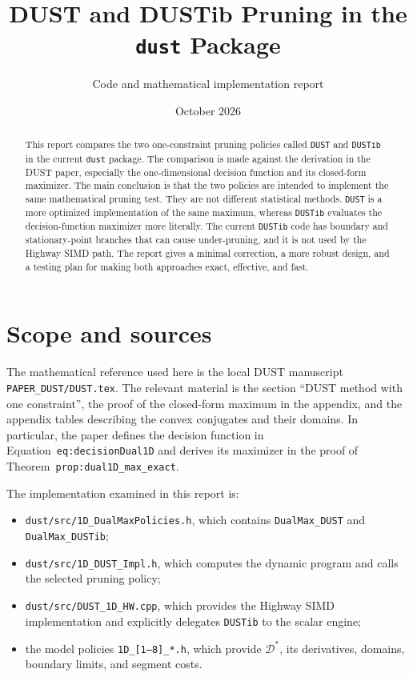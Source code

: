 \documentclass[11pt]{article}
\title{DUST and DUSTib Pruning in the \texttt{dust} Package}
\author{Code and mathematical implementation report}
\date{October 2026}
\newcommand{\Dstar}{\mathcal{D}^*}
\begin{document}
\maketitle

\begin{abstract}
This report compares the two one-constraint pruning policies called
\texttt{DUST} and \texttt{DUSTib} in the current \texttt{dust} package.
The comparison is made against the derivation in the DUST paper, especially
the one-dimensional decision function and its closed-form maximizer.  The
main conclusion is that the two policies are intended to implement the same
mathematical pruning test.  They are not different statistical methods.
\texttt{DUST} is a more optimized implementation of the same maximum, whereas
\texttt{DUSTib} evaluates the decision-function maximizer more literally.
The current \texttt{DUSTib} code has boundary and stationary-point branches
that can cause under-pruning, and it is not used by the Highway SIMD path.
The report gives a minimal correction, a more robust design, and a testing
plan for making both approaches exact, effective, and fast.
\end{abstract}

\tableofcontents

\section{Scope and sources}

The mathematical reference used here is the local DUST manuscript
\texttt{PAPER\_DUST/DUST.tex}.  The relevant material is the section
``DUST method with one constraint'', the proof of the closed-form maximum in
the appendix, and the appendix tables describing the convex conjugates and
their domains.  In particular, the paper defines the decision function in
Equation~\texttt{eq:decisionDual1D} and derives its maximizer in the proof of
Theorem~\texttt{prop:dual1D\_max\_exact}.

The implementation examined in this report is:

\begin{itemize}
  \item \texttt{dust/src/1D\_DualMaxPolicies.h}, which contains
        \texttt{DualMax\_DUST} and \texttt{DualMax\_DUSTib};
  \item \texttt{dust/src/1D\_DUST\_Impl.h}, which computes the dynamic
        program and calls the selected pruning policy;
  \item \texttt{dust/src/DUST\_1D\_HW.cpp}, which provides the Highway SIMD
        implementation and explicitly delegates \texttt{DUSTib} to the
        scalar engine;
  \item the model policies
         \texttt{1D\_[1--8]\_*.h}, which provide $\Dstar$, its derivatives,
        domains, boundary limits, and segment costs.
\end{itemize}
\end{document}
